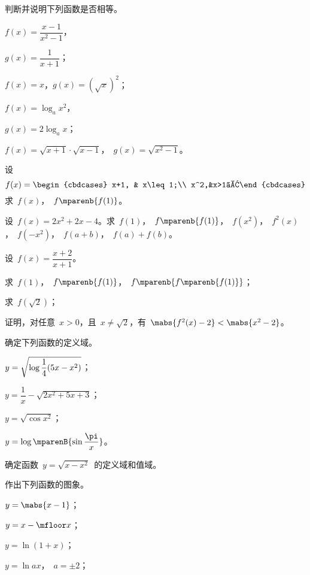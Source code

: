 \begin{exercise}
\item 判断并说明下列函数是否相等。
\begin{exlistcols}[4]
  \item $f(x)=\dfrac{x-1}{x^2-1}$，
  \item[]$g(x)=\dfrac1{x+1}$；
  \item $f(x)=x$，\quad $g(x)=(\sqrt x)^2$；
  \item $f(x)=\log_ax^2$，
  \item[]$g(x)=2\log_ax$；
  \item $f(x)=\sqrt{x+1}\cdot\sqrt{x-1}$，~$g(x)=\sqrt{x^2-1}$。
\end{exlistcols}
\item 设
\[
  f(x)=\begin{cbdcases}
  x+1, & x\leq 1;\\
  x^2,&x>1。\end{cbdcases}
\]
求~$f(x)$，~$f\mparenb{f(1)}$。
\item 设~$f(x)=2x^2+2x-4$。求~$f(1)$，~$f\mparenb{f(1)}$，~$f(x^2)$，~$f^2(x)$，~$f(-x^2)$，~$f(a+b)$，~$f(a)+f(b)$。
\item 设~$f(x)=\dfrac{x+2}{x+1}$。
\begin{exlistcols}
  \item 求~$f(1)$，~$f\mparenb{f(1)}$，~$f\mparenb{f\mparenb{f(1)}}$；
  \item 求~$f(\sqrt2)$；
  \item 证明，对任意~$x>0$，且~$x\neq\sqrt2$，有~$\mabs{f^2(x)-2}<\mabs{x^2-2}$。
\end{exlistcols}
\item 确定下列函数的定义域。
\begin{exlistcols}
  \item $y=\sqrt{\ln\dfrac1{\smash[b]{4}}(5x-x^2)}$；
  \item $y=\dfrac1x-\sqrt{2x^2+5x+3}$；
  \item $y=\sqrt{\cos x^2}$；
  \item $y=\ln\mparenB{\sin\dfrac\pi x}$。
\end{exlistcols}
\item 确定函数~$y=\sqrt{x-x^2}$~的定义域和值域。
\item 作出下列函数的图象。
\begin{exlistcols}[3]
  \item $y=\mabs{x-1}$；
  \item $y=x-\mfloor x$；
  \item $y=\ln(1+x)$；
  \item $y=\ln ax$，~$a=\pm2$；

\end{exlistcols}
\end{exercise}
